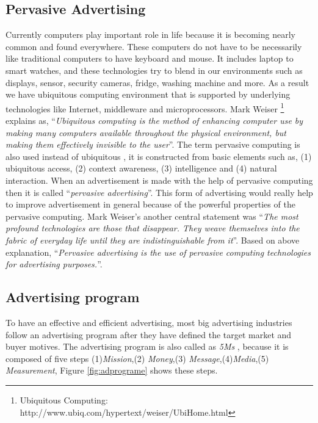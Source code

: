 \subsection{Pervasive Advertising}
Currently computers play important role in life because it is becoming nearly common and found everywhere. These computers do not have to be necessarily like traditional computers to have keyboard and mouse. It includes laptop to smart watches, and these technologies try to blend in our environments such as displays, sensor, security cameras, fridge, washing machine and more. As a result we have ubiquitous computing environment that is supported by underlying technologies like Internet, middleware and microprocessors. Mark Weiser \footnote{Ubiquitous Computing: http://www.ubiq.com/hypertext/weiser/UbiHome.html}\cite{ubiquitous_computing} explains as, ``\emph{Ubiquitous computing is the method of enhancing computer use by making many computers available throughout the physical environment, but making them effectively invisible to the user}''. The term pervasive computing is also used instead of ubiquitous  \cite{pervasiv_ubiquitous}, it is constructed from basic elements \cite{pervais_ad} such as, (1) ubiquitous access, (2) context awareness, (3) intelligence and (4) natural interaction. When an advertisement is made with the help of pervasive computing then it is called ``\emph{pervasive advertising}''. This form of advertising would really help to improve advertisement in general because of the powerful properties of the pervasive computing. Mark Weiser’s \cite{twenty_first} another central statement was ``\emph{The most profound technologies are those that disappear. They weave themselves into the fabric of everyday life until they are indistinguishable from it}''. Based on above explanation, ``\emph{Pervasive advertising is the use of pervasive computing technologies for advertising purposes.}''\cite{pervasiv_ad}.

\subsection{Advertising program}
To have an effective and efficient advertising, most big advertising industries follow an advertising program after they have defined the target market and buyer motives. The advertising program is also called as \emph{5Ms} \cite{adprogram}, because it is composed of five steps (1)\emph{Mission},(2) \emph{Money},(3) \emph{Message},(4)\emph{Media},(5) \emph{Measurement}, Figure \ref{fig:adprograme} shows these steps.

